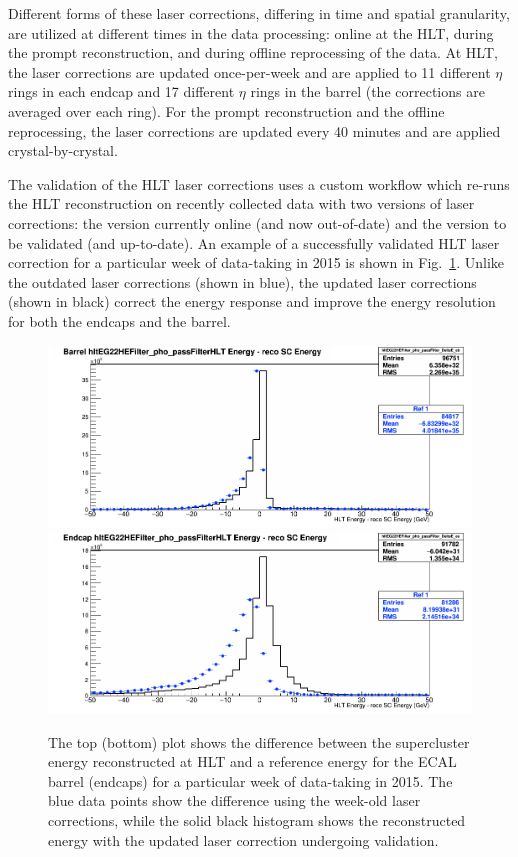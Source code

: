 Different forms of these laser corrections, differing in time and
spatial granularity, are utilized at different
times in the data processing: online at the HLT, during the prompt
reconstruction, and during offline reprocessing of the data. At HLT,
the laser corrections are updated once-per-week and are applied to 11
different $\eta$ rings in each endcap and 17 different $\eta$ rings in
the barrel (the corrections are averaged over each ring). For the prompt reconstruction and the offline
reprocessing, the laser corrections are updated every 40 minutes
and are applied crystal-by-crystal.

The validation of the HLT laser corrections uses a custom workflow which
re-runs the HLT reconstruction on recently collected data with two versions of
laser corrections: the version currently online (and now out-of-date)
and the version to be validated (and up-to-date). An example of a
successfully validated HLT laser correction for a particular week of
data-taking in 2015 is shown in Fig.~\ref{fig:ECALHLT}. Unlike the
outdated laser corrections (shown in blue), the updated
laser corrections (shown in black) correct the energy response and
improve the energy resolution for both the endcaps and the barrel.

\begin{figure}\centering
\includegraphics[width=.9\textwidth]{figs/cms/Week42_transpCorr_EB_overlay_IntermediateBlack_oldBlue.png}\\
\includegraphics[width=.9\textwidth]{figs/cms/Week41_transpCorr_EE_overlay_newBlack_oldBlue.png}
\caption{The top (bottom) plot shows the difference between the supercluster energy
  reconstructed at HLT and a reference energy for the ECAL barrel (endcaps) for a particular
  week of data-taking in 2015. The blue data points show the
  difference using the week-old laser corrections, while the solid black histogram shows the reconstructed energy with the
  updated laser correction undergoing validation.\label{fig:ECALHLT}}
\end{figure}

